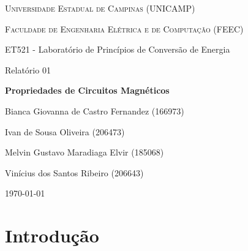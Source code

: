 \documentclass[12pt, a4paper, notitlepage]{article}
\begin{document}
    
    \def\figscale{0.8}
    
    
    \begin{titlepage}
    
        \centering
    
        {\Large \textsc{Universidade Estadual de Campinas (UNICAMP)}\par}
        \vspace{1.5cm}
        {\large \textsc{Faculdade de Engenharia Elétrica e de Computação (FEEC)}\par}
        \vspace{3cm}
        {\large ET521 - Laboratório de Princípios de Conversão de Energia\par}
        \vspace{0.5cm}
        {\large Relatório 01\par}
        \vspace{3cm}
        {\LARGE \bfseries{Propriedades de Circuitos Magnéticos}\par}
        \vspace{3cm}
        Bianca Giovanna de Castro Fernandez (166973) \par\par
        Ivan de Sousa Oliveira (206473) \par\par
        Melvin Gustavo Maradiaga Elvir (185068) \par\par
        Vinícius dos Santos Ribeiro (206643)
        \vfill
    
        {\large \today\par}
        
    \end{titlepage}
    
    \newpage
    
        
        \section{Introdução}
        
\end{document}
